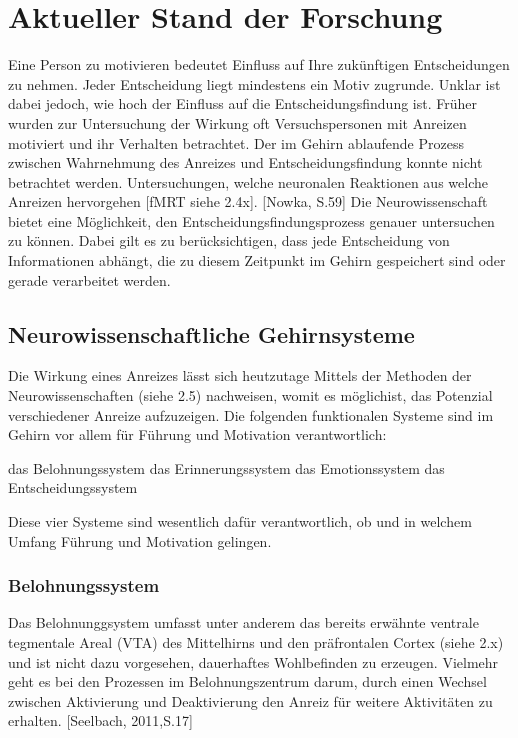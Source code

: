 \section{Aktueller Stand der Forschung} %
Eine Person zu motivieren bedeutet Einfluss auf Ihre zukünftigen Entscheidungen zu nehmen. Jeder Entscheidung liegt mindestens ein Motiv zugrunde. Unklar ist dabei jedoch, wie hoch der Einfluss auf die Entscheidungsfindung ist. Früher wurden zur Untersuchung der Wirkung oft Versuchspersonen mit Anreizen motiviert und ihr Verhalten betrachtet. Der im Gehirn ablaufende Prozess zwischen Wahrnehmung des Anreizes und Entscheidungsfindung konnte nicht betrachtet werden. Untersuchungen, welche neuronalen Reaktionen aus welche Anreizen hervorgehen [fMRT siehe 2.4x]. [Nowka, S.59]
Die Neurowissenschaft bietet eine Möglichkeit, den Entscheidungsfindungsprozess genauer untersuchen zu können. Dabei gilt es zu berücksichtigen, dass jede Entscheidung von Informationen abhängt, die zu diesem Zeitpunkt im Gehirn gespeichert sind oder gerade verarbeitet werden. 


\subsection{Neurowissenschaftliche Gehirnsysteme} %
Die Wirkung eines Anreizes lässt sich heutzutage Mittels der Methoden der Neurowissenschaften (siehe 2.5) nachweisen, womit es möglichist, das Potenzial verschiedener Anreize aufzuzeigen. Die folgenden funktionalen Systeme sind im Gehirn vor allem für Führung und Motivation verantwortlich: 

das Belohnungssystem
das Erinnerungssystem
das Emotionssystem
das Entscheidungssystem

\glqq Diese vier Systeme sind wesentlich dafür verantwortlich, ob und in welchem Umfang Führung und Motivation gelingen.\grqq [Seelbach, 2011, S.16] 

\subsubsection{Belohnungssystem}
Das Belohnunggsystem umfasst unter anderem das bereits erwähnte ventrale tegmentale Areal (VTA) des Mittelhirns und den präfrontalen Cortex (siehe 2.x) und ist nicht dazu vorgesehen, dauerhaftes Wohlbefinden zu erzeugen. Vielmehr geht es bei den Prozessen im Belohnungszentrum darum, durch einen Wechsel zwischen Aktivierung und Deaktivierung den Anreiz für weitere Aktivitäten zu erhalten. [Seelbach, 2011,S.17]

